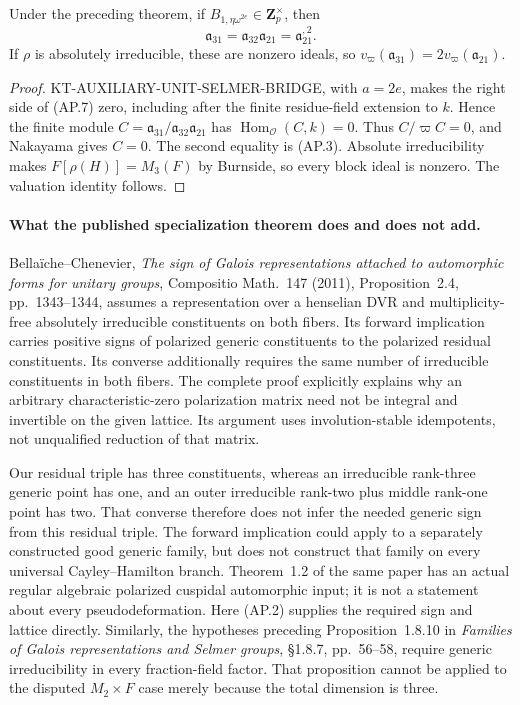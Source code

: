 \begin{corollary}
Under the preceding theorem, if
$B_{1,\eta\omega^{2e}}\in\mathbf Z_p^\times$, then
\[
              \mathfrak a_{31}
                =\mathfrak a_{32}\mathfrak a_{21}
                =\mathfrak a_{21}^{,2}.                    \tag{AP.12}
\]
If $\rho$ is absolutely irreducible, these are nonzero ideals,
so $v_\varpi(\mathfrak a_{31})=2v_\varpi(\mathfrak a_{21})$.
\end{corollary}
\begin{proof}
KT-AUXILIARY-UNIT-SELMER-BRIDGE, with $a=2e$, makes
the right side of (AP.7) zero, including after the finite
residue-field extension to $k$.  Hence the finite module
$C=\mathfrak a_{31}/\mathfrak a_{32}\mathfrak a_{21}$
has $\operatorname{Hom}_{\mathcal O}(C,k)=0$.
Thus $C/\varpi C=0$, and Nakayama gives $C=0$.
The second equality is (AP.3).  Absolute irreducibility
makes $F[\rho(H)]=M_3(F)$ by Burnside, so every block
ideal is nonzero.  The valuation identity follows.
\end{proof}

\paragraph{What the published specialization theorem does and does not add.}
Bella\"iche--Chenevier, \emph{The sign of Galois representations
attached to automorphic forms for unitary groups},
Compositio Math.\ 147 (2011), Proposition~2.4, pp.~1343--1344,
assumes a representation over a henselian DVR and
multiplicity-free absolutely irreducible constituents on
both fibers.  Its forward implication carries positive
signs of polarized generic constituents to the polarized
residual constituents.  Its converse additionally requires
the same number of irreducible constituents in both fibers.
The complete proof explicitly explains why an arbitrary
characteristic-zero polarization matrix need not be integral
and invertible on the given lattice.  Its argument uses
involution-stable idempotents, not unqualified reduction of
that matrix.

Our residual triple has three constituents, whereas an
irreducible rank-three generic point has one, and an outer
irreducible rank-two plus middle rank-one point has two.
That converse therefore does not infer the needed generic
sign from this residual triple.  The forward implication
could apply to a separately constructed good generic family,
but does not construct that family on every universal
Cayley--Hamilton branch.  Theorem~1.2 of the same paper has
an actual regular algebraic polarized cuspidal automorphic
input; it is not a statement about every pseudodeformation.
Here (AP.2) supplies the required sign and lattice directly.
Similarly, the hypotheses preceding Proposition~1.8.10 in
\emph{Families of Galois representations and Selmer groups},
\S1.8.7, pp.~56--58, require generic irreducibility in
every fraction-field factor.  That proposition cannot be
applied to the disputed $M_2\times F$ case merely because
the total dimension is three.

